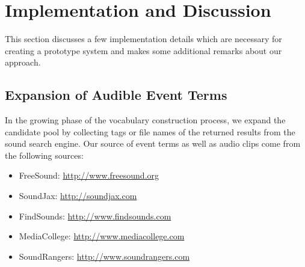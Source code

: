 \section{Implementation and Discussion}
\label{sec:impl}

This section discusses a few implementation details which are necessary for
creating a prototype system and makes some additional remarks about
our approach.

\subsection{Expansion of Audible Event Terms}
In the growing phase of the vocabulary construction process, we expand the
candidate pool by collecting tags or file names of the returned results
from the sound search engine.
Our source of event terms as well as audio clips come from the following
sources:
\begin{itemize}
\item FreeSound: \url{http://www.freesound.org}
\item SoundJax: \url{http://soundjax.com}
\item FindSounds: \url{http://www.findsounds.com}
\item MediaCollege: \url{http://www.mediacollege.com}
\item SoundRangers: \url{http://www.soundrangers.com}
\end{itemize}

